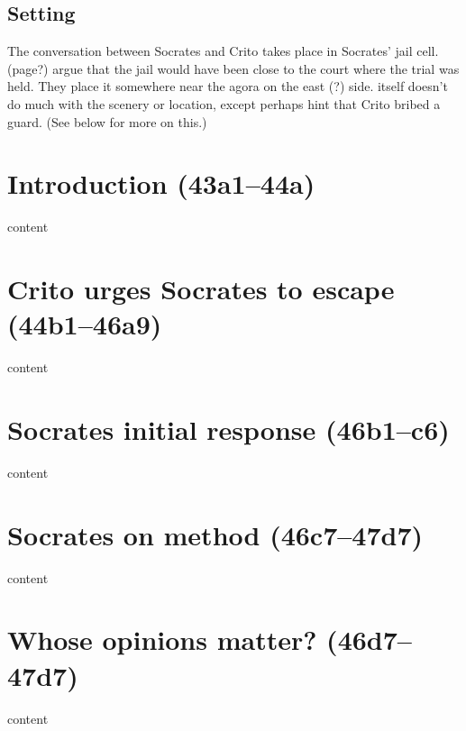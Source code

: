 \documentclass[11pt]{article}
\begin{document}
\subsection{Setting}

The conversation between Socrates and Crito takes place in Socrates' jail cell.  \citet{brickhouse2004} (page?) argue that the jail would have been close to the court where the trial was held.  They place it somewhere near the agora on the east (?) side.   itself doesn't do much with the scenery or location, except perhaps hint that Crito bribed a guard.  (See below for more on this.)

\section{Introduction (43a1--44a)}

content

\section{Crito urges Socrates to escape (44b1--46a9)}

content

\section{Socrates initial response (46b1--c6)}

content

\section{Socrates on method (46c7--47d7)}

content

\section{Whose opinions matter? (46d7--47d7)}

content
\end{document}
